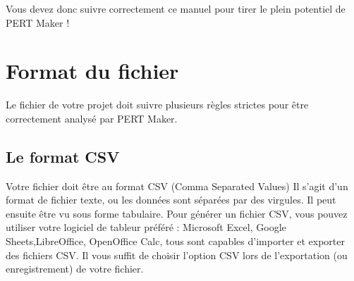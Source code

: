 \documentclass{article}
\begin{document}
Vous devez donc suivre correctement ce manuel pour tirer le plein potentiel de PERT Maker !

\section{Format du fichier}
Le fichier de votre projet doit suivre plusieurs règles strictes pour être correctement analysé par PERT Maker.

\subsection{Le format CSV}
Votre fichier doit être au format CSV (Comma Separated Values)
Il s'agit d'un format de fichier texte, ou les données sont séparées par des virgules.
Il peut ensuite être vu sous forme tabulaire.
Pour générer un fichier CSV, vous pouvez utiliser votre logiciel de tableur préféré :
Microsoft Excel, Google Sheets,LibreOffice, OpenOffice Calc, tous sont capables d'importer
et exporter des fichiers CSV.
Il vous suffit de choisir l'option CSV lors de l'exportation (ou enregistrement) de votre fichier.
\end{document}
